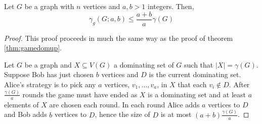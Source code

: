 \begin{theorem} %
    Let $G$ be a graph with $n$ vertices and $a,b>1$ integers. Then,
    \[\gamma_{g}(G;a,b) \leq \frac{a+b}{a}\gamma(G)\]
\end{theorem}
\begin{proof}
    This proof proceeds in much the same way as the proof of theorem \ref{thm:gamedomup}.
    
   Let $G$ be a graph and $X\subseteq V(G)$ a dominating set of $G$ such that $|X| = \gamma(G)$. Suppose Bob has just chosen $b$ vertices and $D$ is the current dominating set. Alice's strategy is to pick any $a$ vertices, $v_1,\dots,v_a$, in $X$ that each $v_i\notin D$. After $\frac{\gamma(G)}{a}$ rounds the game must have ended as $X$ is a dominating set and at least $a$ elements of $X$ are chosen each round. In each round Alice adds $a$ vertices to $D$ and Bob adds $b$ vertices to $D$, hence the size of $D$ is at most $(a+b)\frac{\gamma(G)}{a}$.
\end{proof}













